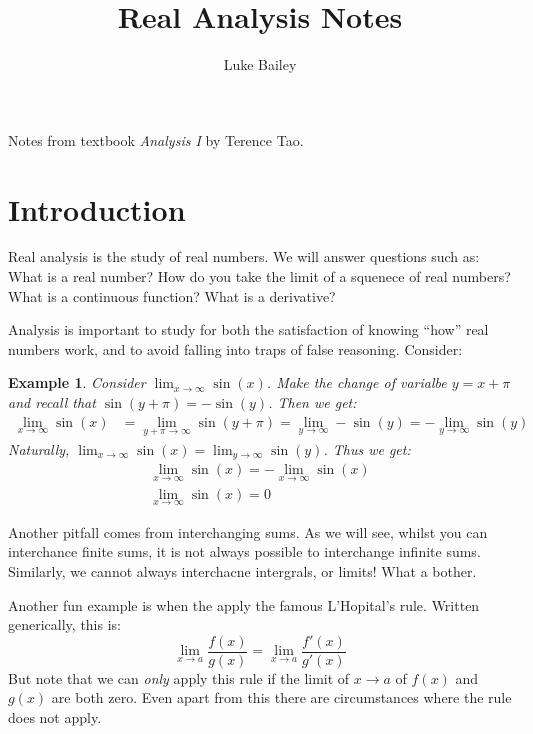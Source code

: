 \documentclass{article}
\title{Real Analysis Notes}
\author{Luke Bailey}
\date{}
\newtheorem{example}{Example}[subsection]
\begin{document}
\maketitle

\noindent Notes from textbook \textit{Analysis I} by Terence Tao.

\tableofcontents
\newpage

\section{Introduction}

Real analysis is the study of real numbers. We will answer 
questions such as: What is a real number? How
do you take the limit of a squenece of real numbers? 
What is a continuous function? What is a derivative?

Analysis is important to study for both the 
satisfaction of knowing ``how'' real numbers work,
and to avoid falling into traps of false reasoning.
Consider: 

\begin{example}
	Consider $\lim_{x \to \infty} \sin(x)$. Make the 
	change of varialbe $y = x + \pi$ and recall 
	that $\sin(y + \pi) = - \sin(y)$. Then we get: 
	\begin{align*}
		\lim _{x \to \infty} \sin(x) &= \lim _{y + \pi \to \infty}
		\sin(y + \pi) 
		= \lim_{y \to \infty} - \sin(y) = - \lim_{y \to \infty}\sin(y)
	\end{align*}
	Naturally, $\lim_{x \to \infty}\sin(x)= \lim_{y \to \infty}\sin(y)$. Thus 
	we get: 
	\begin{align*}
		\lim_{x \to \infty}\sin(x) = - \lim_{x \to \infty}\sin(x)\\
		\lim_{x \to \infty}\sin(x) = 0
	\end{align*}
\end{example}

Another pitfall comes from interchanging sums. As we will see, 
whilst you can interchance finite sums, it is not always 
possible to interchange infinite sums. Similarly, 
we cannot always interchacne intergrals, or limits! What a bother. 

Another fun example is when the apply the famous L'Hopital's rule.
Written generically, this is:
$$
\lim_{x \to a} \frac{f(x)}{g(x)} = \lim_{x \to a} \frac{f'(x)}{g'(x)}
$$
But note that we can \emph{only} apply this rule if the limit 
of $x \to a$ of $f(x)$ and $g(x)$ are both zero. Even apart 
from this there are circumstances where the rule does not apply.
\end{document}

